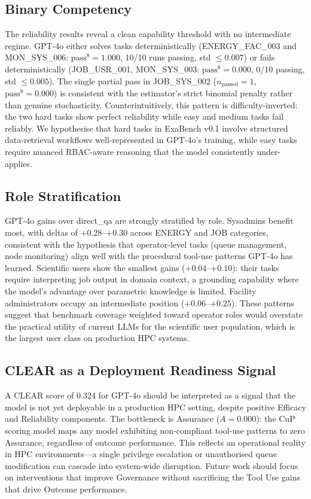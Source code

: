 \documentclass[12pt]{article}
\begin{document}
\subsection{Binary Competency}

The reliability results reveal a clean capability threshold with no
intermediate regime. GPT-4o either solves tasks deterministically
(ENERGY\_FAC\_003 and MON\_SYS\_006: $\text{pass}^8=1.000$, 10/10 runs
passing, std $\leq 0.007$) or fails deterministically (JOB\_USR\_001,
MON\_SYS\_003: $\text{pass}^8=0.000$, 0/10 passing, std $\leq 0.005$). The
single partial pass in JOB\_SYS\_002 ($n_\text{passed}=1$,
$\text{pass}^8=0.000$) is consistent with the estimator's strict binomial
penalty rather than genuine stochasticity. Counterintuitively, this pattern
is difficulty-inverted: the two hard tasks show perfect reliability while
easy and medium tasks fail reliably. We hypothesise that hard tasks in
ExaBench v0.1 involve structured data-retrieval workflows well-represented in
GPT-4o's training, while easy tasks require nuanced RBAC-aware reasoning that
the model consistently under-applies.

\subsection{Role Stratification}

GPT-4o gains over direct\_qa are strongly stratified by role. Sysadmins
benefit most, with deltas of $+0.28$--$+0.30$ across ENERGY and JOB
categories, consistent with the hypothesis that operator-level tasks (queue
management, node monitoring) align well with the procedural tool-use patterns
GPT-4o has learned. Scientific users show the smallest gains
($+0.04$--$+0.10$): their tasks require interpreting job output in domain
context, a grounding capability where the model's advantage over parametric
knowledge is limited. Facility administrators occupy an intermediate position
($+0.06$--$+0.25$). These patterns suggest that benchmark coverage weighted
toward operator roles would overstate the practical utility of current LLMs
for the scientific user population, which is the largest user class on
production HPC systems.

\subsection{CLEAR as a Deployment Readiness Signal}

A CLEAR score of 0.324 for GPT-4o should be interpreted as a signal that the
model is not yet deployable in a production HPC setting, despite positive
Efficacy and Reliability components. The bottleneck is Assurance ($A=0.000$):
the CuP scoring model maps any model exhibiting non-compliant tool-use
patterns to zero Assurance, regardless of outcome performance. This reflects
an operational reality in HPC environments---a single privilege escalation or
unauthorised queue modification can cascade into system-wide disruption.
Future work should focus on interventions that improve Governance without
sacrificing the Tool Use gains that drive Outcome performance.
\end{document}
